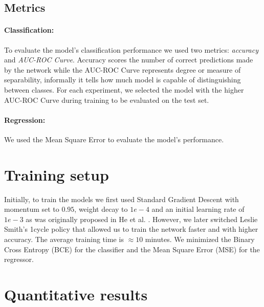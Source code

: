 \documentclass[../document.tex]{subfiles}
\begin{document}
\subsection{Metrics}
\paragraph{Classification:} To evaluate the model's classification performance we used two metrics: \emph{accuracy} and \emph{AUC-ROC Curve}. Accuracy scores the number of correct predictions made by the network while the AUC-ROC Curve represents degree or measure of separability, informally it tells how much model is capable of distinguishing between classes. For each experiment, we selected the model with the higher AUC-ROC Curve during training to be evaluated on the test set.

\paragraph{Regression:} We used the Mean Square Error to evaluate the model's performance.

\section{Training setup}
Initially, to train the models we first used Standard Gradient Descent with momentum set to $0.95$, weight decay to $1e-4$ and an initial learning rate of $1e-3$ as was originally proposed in He et al. \cite{he2015deep}. However, we later switched Leslie Smith's 1cycle policy \cite{1cycle} that allowed us to train the network faster and with higher accuracy. The average training time is $\approx 10$ minutes. We minimized the Binary Cross Entropy (BCE) for the classifier and the  Mean Square Error (MSE) for the regressor.

\section{Quantitative results}
\end{document}
